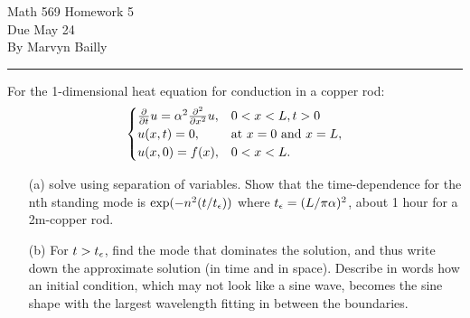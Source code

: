 \documentclass[12pt]{report}
\begin{document}
\large

\begin{center}
 Math 569 Homework 5\\
 Due May 24\\
 By Marvyn Bailly\\
\end{center}

\normalsize

\hrule



\begin{problem}
    For the 1-dimensional heat equation for conduction in a copper rod:
    \[
        \begin{cases}
            \frac{\partial }{\partial t}u = \alpha^2 \frac{\partial^{2} }{\partial x^{2}}u, &0<x<L,t>0\\
            u(x,t) = 0, &\text{at}~x=0 {~\text{and}~} x=L,\\
            u(x,0) = f(x), &0 < x < L.
        \end{cases}
    \] 
    \begin{enumerate}
        \item [(a)]
        solve using separation of variables. Show that the time-dependence for the nth standing mode is $\text{exp}(-n^2(t/t_{\epsilon}))$ where $t_{\epsilon} = (L/\pi \alpha)^2$, about 1 hour for a 2m-copper rod.


        \item [(b)]
        For $t>t_{\epsilon}$, find the mode that dominates the solution, and thus write down the
        approximate solution (in time and in space). Describe in words how an initial condition,
        which may not look like a sine wave, becomes the sine shape with the largest wavelength
        fitting in between the boundaries.

    
    \end{enumerate}
\end{problem}
\end{document}
